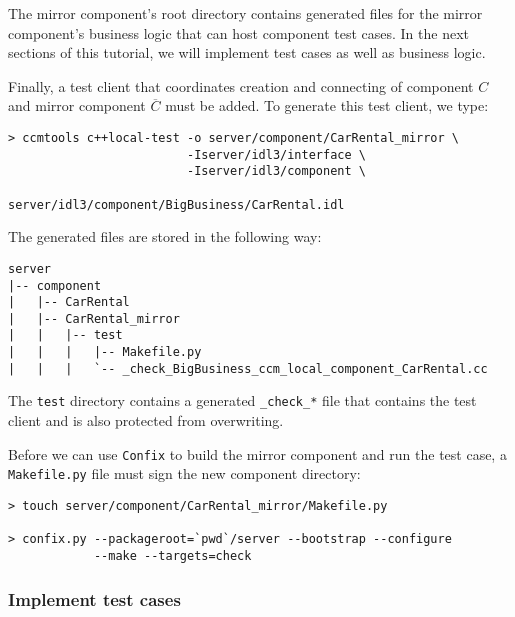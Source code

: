 The mirror component's root directory contains generated files for the mirror
component's business logic that can host component test cases.
In the next sections of this tutorial, we will implement test cases as well
as business logic. 


Finally, a test client that coordinates creation and connecting of 
component $C$ and mirror component $\overline{C}$ must be added.
To generate this test client, we type:
\begin{small}
\begin{verbatim}
> ccmtools c++local-test -o server/component/CarRental_mirror \
                         -Iserver/idl3/interface \
                         -Iserver/idl3/component \
                         server/idl3/component/BigBusiness/CarRental.idl
\end{verbatim}
\end{small}

The generated files are stored in the following way:
\begin{small}
\begin{verbatim}
server
|-- component
|   |-- CarRental
|   |-- CarRental_mirror
|   |   |-- test
|   |   |   |-- Makefile.py
|   |   |   `-- _check_BigBusiness_ccm_local_component_CarRental.cc
\end{verbatim}
\end{small}

The {\tt test} directory contains a generated {\tt \_check\_*} file that 
contains the test client and is also protected from overwriting.

Before we can use {\tt Confix} to build the mirror component and run the
test case, a {\tt Makefile.py} file must sign the new component directory:
\begin{small}
\begin{verbatim}
> touch server/component/CarRental_mirror/Makefile.py

> confix.py --packageroot=`pwd`/server --bootstrap --configure 
            --make --targets=check 
\end{verbatim}
\end{small}


\newpage
\subsubsection{Implement test cases}

